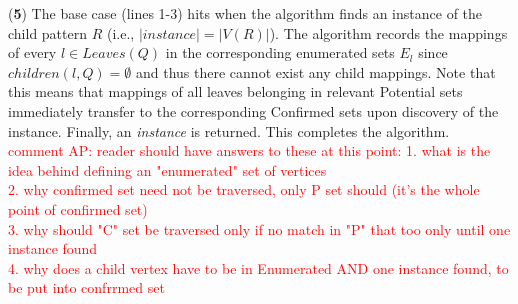 (\textbf{5}) The base case (lines 1-3) hits when the algorithm finds an
instance of the child pattern $R$ (i.e., $|instance|=|V(R)|$). The algorithm
records the mappings of every $l\in Leaves(Q)$ in the corresponding enumerated
sets $E_{l}$ since $children(l,Q)=\emptyset$ and thus there cannot exist any child
mappings. Note that this means that mappings of all leaves belonging in relevant
Potential sets immediately transfer to the corresponding Confirmed sets upon
discovery of the instance. Finally, an \emph{instance} is returned. This
completes the algorithm. 
\textcolor{red}{\\comment AP: reader should have answers to these at this point:
1. what is the idea behind defining an "enumerated" set of vertices\\
2. why confirmed set need not be traversed, only P set should (it's the whole point of
confirmed set)\\
3. why should "C" set be traversed only if no match in "P" that too only until one
instance found\\
4. why does a child vertex have to be in Enumerated AND one instance found, to
be put into confrrmed set\\
}

